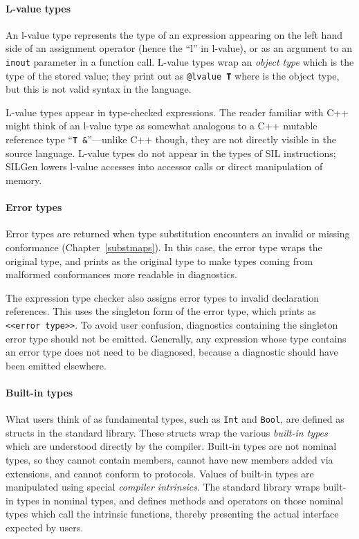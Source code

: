 \documentclass[../generics]{subfiles}
\begin{document}
\paragraph{L-value types}
An l-value type represents the type of an expression appearing on the left hand side of an assignment operator (hence the ``l'' in l-value), or as an argument to an \texttt{inout} parameter in a function call. L-value types wrap an \emph{object type} which is the type of the stored value; they print out as \texttt{@lvalue~\textbf{T}} where  is the object type, but this is not valid syntax in the language.

L-value types appear in type-checked expressions. The reader familiar with C++ might think of an l-value type as somewhat analogous to a C++ mutable reference type ``\texttt{\textbf{T}~\&}''---unlike C++ though, they are not directly visible in the source language. L-value types do not appear in the types of SIL instructions; SILGen lowers l-value accesses into accessor calls or direct manipulation of memory.

\paragraph{Error types}
Error types are returned when type substitution encounters an invalid or missing conformance (Chapter~\ref{substmaps}). In this case, the error type wraps the original type, and prints as the original type to make types coming from malformed conformances more readable in diagnostics.

The expression type checker also assigns error types to invalid declaration references. This uses the singleton form of the error type, which prints as \texttt{<<error~type>>}. To avoid user confusion, diagnostics containing the singleton error type should not be emitted. Generally, any expression whose type contains an error type does not need to be diagnosed, because a diagnostic should have been emitted elsewhere.

\paragraph{Built-in types}
What users think of as fundamental types, such as \texttt{Int} and \texttt{Bool}, are defined as structs in the standard library. These structs wrap the various \emph{built-in types} which are understood directly by the compiler. Built-in types are not nominal types, so they cannot contain members, cannot have new members added via extensions, and cannot conform to protocols. Values of built-in types are manipulated using special \emph{compiler intrinsics}. The standard library wraps built-in types in nominal types, and defines methods and operators on those nominal types which call the intrinsic functions, thereby presenting the actual interface expected by users.
\end{document}
